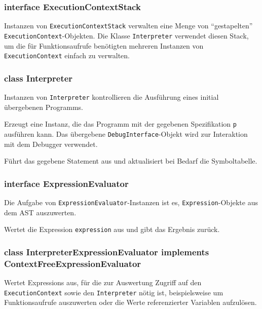 \subsubsection{interface ExecutionContextStack}

Instanzen von \texttt{ExecutionContextStack} verwalten eine Menge von "`gestapelten"' \texttt{ExecutionContext}-Objekten. Die Klasse \texttt{Interpreter} verwendet diesen Stack, um die für Funktionsaufrufe benötigten mehreren Instanzen von \texttt{ExecutionContext} einfach zu verwalten.

\subsubsection{class Interpreter}

Instanzen von \texttt{Interpreter} kontrollieren die Ausführung eines initial übergebenen Programms.

\begin{description}
    Erzeugt eine Instanz, die das Programm mit der gegebenen Spezifikation \texttt{p} ausführen kann. Das übergebene \texttt{DebugInterface}-Objekt wird zur Interaktion mit dem Debugger verwendet.

    Führt das gegebene Statement aus und aktualisiert bei Bedarf die Symboltabelle.
\end{description}


\subsubsection{interface ExpressionEvaluator}
Die Aufgabe von \texttt{ExpressionEvaluator}-Instanzen ist es, \texttt{Expression}-Objekte aus dem AST auszuwerten.
\begin{description}
    Wertet die Expression \texttt{expression} aus und gibt das Ergebnis zurück.
\end{description}

\subsubsection{class InterpreterExpressionEvaluator implements ContextFreeExpressionEvaluator}
Wertet Expressions aus, für die zur Auswertung Zugriff auf den \texttt{ExecutionContext} sowie den \texttt{Interpreter} nötig ist, beispielsweise um Funktionsaufrufe auszuwerten oder die Werte referenzierter Variablen aufzulösen.

